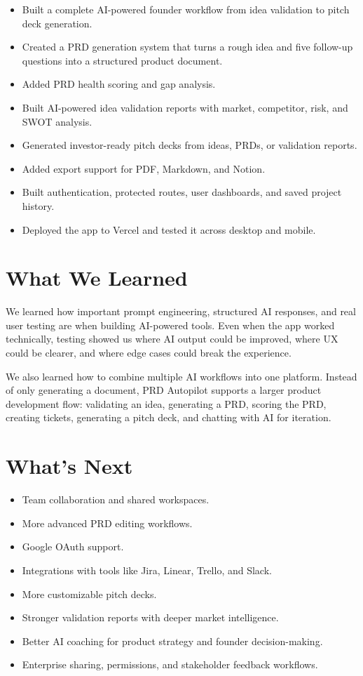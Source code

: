 \documentclass[11pt]{article}
\begin{document}
\begin{itemize}
    \item Built a complete AI-powered founder workflow from idea validation to pitch deck generation.
    \item Created a PRD generation system that turns a rough idea and five follow-up questions into a structured product document.
    \item Added PRD health scoring and gap analysis.
    \item Built AI-powered idea validation reports with market, competitor, risk, and SWOT analysis.
    \item Generated investor-ready pitch decks from ideas, PRDs, or validation reports.
    \item Added export support for PDF, Markdown, and Notion.
    \item Built authentication, protected routes, user dashboards, and saved project history.
    \item Deployed the app to Vercel and tested it across desktop and mobile.
\end{itemize}

\section{What We Learned}

We learned how important prompt engineering, structured AI responses, and real user testing are when building AI-powered tools. Even when the app worked technically, testing showed us where AI output could be improved, where UX could be clearer, and where edge cases could break the experience.

We also learned how to combine multiple AI workflows into one platform. Instead of only generating a document, PRD Autopilot supports a larger product development flow: validating an idea, generating a PRD, scoring the PRD, creating tickets, generating a pitch deck, and chatting with AI for iteration.

\section{What's Next}

\begin{itemize}
    \item Team collaboration and shared workspaces.
    \item More advanced PRD editing workflows.
    \item Google OAuth support.
    \item Integrations with tools like Jira, Linear, Trello, and Slack.
    \item More customizable pitch decks.
    \item Stronger validation reports with deeper market intelligence.
    \item Better AI coaching for product strategy and founder decision-making.
    \item Enterprise sharing, permissions, and stakeholder feedback workflows.
\end{itemize}
\end{document}
